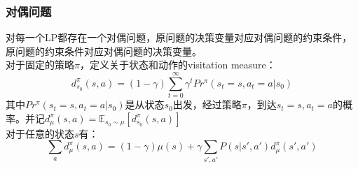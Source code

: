 \subsubsection{对偶问题}
对每一个LP都存在一个对偶问题，原问题的决策变量对应对偶问题的约束条件，原问题的约束条件对应对偶问题的决策变量。\\
对于固定的策略$\pi$，定义关于状态和动作的visitation measure：
\begin{equation}
    d^{\pi}_{s_0}(s,a)=(1-\gamma)\sum_{t=0}^{\infty}\gamma^tPr^\pi (s_t=s,a_t=a|s_0)
\end{equation}
其中$Pr^\pi (s_t=s,a_t=a|s_0)$是从状态$s_0$出发，经过策略$\pi$，到达$s_t=s,a_t=a$的概率。并记$d^{\pi}_{\mu}(s,a)=\mathbb{E}_{s_0\sim\mu}[d^{\pi}_{s_0}(s,a)]$\\
对于任意的状态$s$有：
\begin{equation}
    \underset{a}{\sum}d^{\pi}_{\mu}(s,a)=(1-\gamma)\mu(s)+\gamma\underset{s',a'}{\sum}P(s|s',a')d^{\pi}_{\mu}(s',a')
\end{equation}

